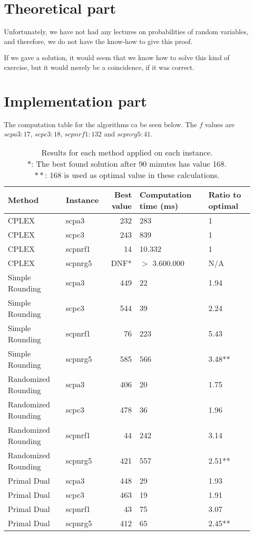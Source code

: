 \section{Theoretical part}
Unfortunately, we have not had any lectures on probabilities of random variables, and therefore, we do not have the know-how to give this proof.

\newpar If we gave a solution, it would seem that we know how to solve this kind of exercise, but it would merely be a coincidence, if it was correct.

\section{Implementation part}
The computation table for the algorithms ca be seen below. The $f$ values are $scpa3: 17$, $scpc3: 18$, $scpnrf1: 132$ and $scpnrg5: 41$.

\begin{table}[H]
	\centering
	\begin{tabularx}{\linewidth}{|X|l|r|X|X|}
		\hline
		\textbf{Method} & \textbf{Instance} & \textbf{Best value} & \textbf{Computation time (ms)} & \textbf{Ratio to optimal}\\\hline
		CPLEX & scpa3 & 232 & 283 & 1\\\hline
		CPLEX & scpc3 & 243 & 839 & 1\\\hline
		CPLEX & scpnrf1 & 14 & 10.332 & 1\\\hline
		CPLEX & scpnrg5 & DNF* & $>$ 3.600.000 & N/A\\\hline\hline
		Simple Rounding & scpa3 & 449 & 22 & 1.94\\\hline
		Simple Rounding & scpc3 & 544 & 39 & 2.24\\\hline
		Simple Rounding & scpnrf1 & 76 & 223 & 5.43\\\hline
		Simple Rounding & scpnrg5 & 585 & 566 & 3.48**\\\hline\hline
		Randomized Rounding & scpa3 & 406 & 20 & 1.75\\\hline
		Randomized Rounding & scpc3 & 478 & 36 & 1.96\\\hline
		Randomized Rounding & scpnrf1 & 44 & 242 & 3.14\\\hline
		Randomized Rounding & scpnrg5 & 421 & 557 & 2.51**\\\hline\hline
		Primal Dual & scpa3 & 448 & 29 & 1.93\\\hline
		Primal Dual & scpc3 & 463 & 19 & 1.91\\\hline
		Primal Dual & scpnrf1 & 43 & 75 & 3.07\\\hline
		Primal Dual & scpnrg5 & 412 & 65 & 2.45**\\\hline
	\end{tabularx}
	\caption{Results for each method applied on each instance.\\ $*$: The best found solution after 90 minutes has value 168.\\ $**$: 168 is used as optimal value in these calculations.}
\end{table}

